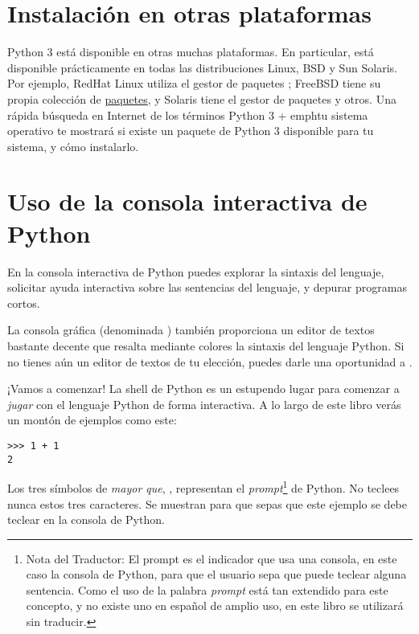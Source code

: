 \section{Instalación en otras plataformas}

Python 3 está disponible en otras muchas plataformas. En particular, está disponible prácticamente en todas las distribuciones Linux, BSD y Sun Solaris. Por ejemplo, RedHat Linux utiliza el gestor de paquetes ; FreeBSD tiene su propia colección de \href{http://www.freebsd.org/ports/}{paquetes}, y Solaris tiene el gestor de paquetes  y otros. Una rápida búsqueda en Internet de los términos Python 3 + emph{tu sistema operativo} te mostrará si existe un paquete de Python 3 disponible para tu sistema, y cómo instalarlo.

\section{Uso de la consola interactiva de Python}\label{sec:shell}

En la consola interactiva de Python puedes explorar la sintaxis del lenguaje, solicitar ayuda interactiva sobre las sentencias del lenguaje, y depurar programas cortos.

La consola gráfica (denominada ) también proporciona un editor de textos bastante decente que resalta mediante colores la sintaxis del lenguaje Python. Si no tienes aún un editor de textos de tu elección, puedes darle una oportunidad a .

¡Vamos a comenzar! La shell de Python es un estupendo lugar para comenzar a \emph{jugar} con el lenguaje Python de forma interactiva.  A lo largo de este libro verás un montón de ejemplos como este:

\begin{listing}
\begin{verbatim}
>>> 1 + 1
2
\end{verbatim}
\end{listing}

Los tres símbolos de \emph{mayor que}, \codigo{$>>>$}, representan el \emph{prompt}\footnote{Nota del Traductor: El prompt es el indicador que usa una consola, en este caso la consola de Python, para que el usuario sepa que puede teclear alguna sentencia. Como el uso de la palabra \emph{prompt} está tan extendido para este concepto, y no existe uno en español de amplio uso, en este libro se utilizará sin traducir.} de Python. No teclees nunca estos tres caracteres. Se muestran para que sepas que este ejemplo se debe teclear en la consola de Python.


